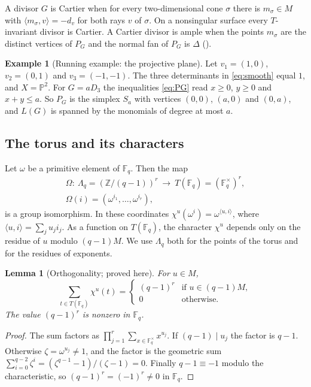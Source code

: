 \documentclass[12pt,letterpaper]{article}
\numberwithin{equation}{section}
\newtheorem{lemma}[theorem]{Lemma}
\theoremstyle{definition}
\newtheorem{example}[theorem]{Example}
\theoremstyle{remark}
\newcommand{\Z}{\mathbb{Z}}
\newcommand{\PP}{\mathbb{P}}
\newcommand{\Fq}{\mathbb{F}_q}
\newcommand{\Fqs}{\mathbb{F}_q^{\times}}
\newcommand{\Lq}{\Lambda_q}
\begin{document}
A divisor $G$ is Cartier when for every two-dimensional cone $\sigma$ there is
$m_\sigma\in M$ with $\langle m_\sigma,v\rangle=-d_v$ for both rays $v$ of
$\sigma$. On a nonsingular surface every $T$-invariant divisor is Cartier. A
Cartier divisor is ample when the points $m_\sigma$ are the distinct vertices
of $P_G$ and the normal fan of $P_G$ is $\Delta$ (\cite[\S3.4]{Fu93}).

\begin{example}[Running example: the projective plane]\label{ex:P2}
Let $v_1=(1,0)$, $v_2=(0,1)$ and $v_3=(-1,-1)$. The three determinants in
\eqref{eq:smooth} equal $1$, and $X=\PP^2$. For $G=aD_3$ the inequalities
\eqref{eq:PG} read $x\ge0$, $y\ge0$ and $x+y\le a$. So $P_G$ is the simplex
$S_a$ with vertices $(0,0)$, $(a,0)$ and $(0,a)$, and $L(G)$ is spanned by the
monomials of degree at most $a$.
\end{example}

\subsection{The torus and its characters}\label{sec:torus}

Let $\omega$ be a primitive element of $\Fq$. Then the map
\begin{equation}\label{eq:Omega}
\begin{gathered}
\Omega:\ \Lq=(\Z/(q-1))^r\ \longrightarrow\ T(\Fq)=(\Fqs)^r,\\
\Omega(i)=(\omega^{i_1},\dots,\omega^{i_r}),
\end{gathered}
\end{equation}
is a group isomorphism. In these coordinates
$\chi^u(\omega^i)=\omega^{\langle u,i\rangle}$, where
$\langle u,i\rangle=\sum_j u_ji_j$. As a function on $T(\Fq)$, the character
$\chi^u$ depends only on the residue of $u$ modulo $(q-1)M$. We use $\Lq$ both
for the points of the torus and for the residues of exponents.

\begin{lemma}[Orthogonality; proved here]\label{lem:orth}
For $u\in M$,
\[
\sum_{t\in T(\Fq)}\chi^u(t)=
\begin{cases}(q-1)^r & \text{if } u\in(q-1)M,\\ 0 & \text{otherwise.}\end{cases}
\]
The value $(q-1)^r$ is nonzero in $\Fq$.
\end{lemma}

\begin{proof}
The sum factors as $\prod_{j=1}^r\sum_{x\in\Fqs}x^{u_j}$. If
$(q-1)\mid u_j$ the factor is $q-1$. Otherwise
$\zeta=\omega^{u_j}\ne1$, and the factor is the geometric sum
$\sum_{i=0}^{q-2}\zeta^i=(\zeta^{q-1}-1)/(\zeta-1)=0$. Finally
$q-1\equiv-1$ modulo the characteristic, so $(q-1)^r=(-1)^r\ne0$ in $\Fq$.
\end{proof}
\end{document}
